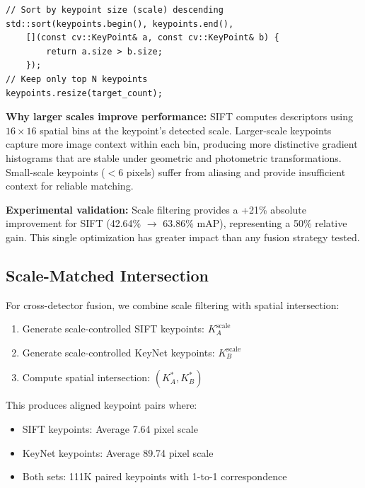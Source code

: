 \begin{verbatim}
// Sort by keypoint size (scale) descending
std::sort(keypoints.begin(), keypoints.end(),
    [](const cv::KeyPoint& a, const cv::KeyPoint& b) {
        return a.size > b.size;
    });
// Keep only top N keypoints
keypoints.resize(target_count);
\end{verbatim}

\textbf{Why larger scales improve performance:} SIFT computes descriptors using $16 \times 16$ spatial bins at the keypoint's detected scale. Larger-scale keypoints capture more image context within each bin, producing more distinctive gradient histograms that are stable under geometric and photometric transformations. Small-scale keypoints ($<$6 pixels) suffer from aliasing and provide insufficient context for reliable matching.

\textbf{Experimental validation:} Scale filtering provides a +21\% absolute improvement for SIFT (42.64\% $\rightarrow$ 63.86\% mAP), representing a 50\% relative gain. This single optimization has greater impact than any fusion strategy tested.

\subsection{Scale-Matched Intersection}

For cross-detector fusion, we combine scale filtering with spatial intersection:

\begin{enumerate}
    \item Generate scale-controlled SIFT keypoints: $K_A^{\text{scale}}$
    \item Generate scale-controlled KeyNet keypoints: $K_B^{\text{scale}}$
    \item Compute spatial intersection: $(K_A^*, K_B^*)$
\end{enumerate}

This produces aligned keypoint pairs where:
\begin{itemize}
    \item SIFT keypoints: Average 7.64 pixel scale
    \item KeyNet keypoints: Average 89.74 pixel scale
    \item Both sets: 111K paired keypoints with 1-to-1 correspondence
\end{itemize}

